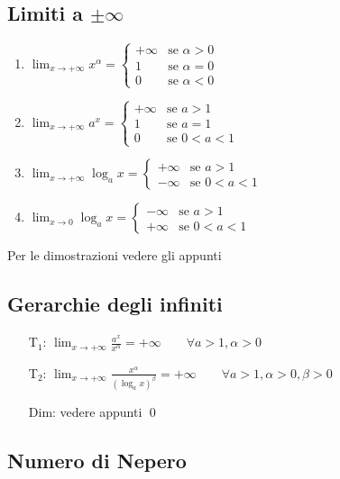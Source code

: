 \documentclass[a4paper]{article}
\begin{document}
\subsection{Limiti a \(\pm \infty\)}
\begin{enumerate}
	\item \(\displaystyle \lim_{x \to + \infty} x ^ \alpha =
	\begin{cases}
		+ \infty & \text{se } \alpha > 0 \\
		1 & \text{se } \alpha = 0 \\
		0 & \text{se } \alpha < 0
	\end{cases}\)
	\item \(\displaystyle \lim_{x \to + \infty} a ^ x =
	\begin{cases}
		+ \infty & \text{se } a > 1 \\
		1 & \text{se } a = 1 \\
		0 & \text{se } 0 < a < 1
	\end{cases}\)
	\item \(\displaystyle \lim_{x \to + \infty} \log_a x =
	\begin{cases}
		+ \infty & \text{se } a > 1 \\
		- \infty & \text{se } 0 < a < 1
	\end{cases}\)
	\item \(\displaystyle \lim_{x \to 0} \log_a x =
	\begin{cases}
		- \infty & \text{se } a > 1 \\
		+ \infty & \text{se } 0 < a < 1
	\end{cases}\)
\end{enumerate}
Per le dimostrazioni vedere gli appunti

\subsection{Gerarchie degli infiniti}
\begin{itemize}
	\item[T\(_1\):] \(\displaystyle \lim_{x \to + \infty} \frac{a^x}{x^\alpha} = + \infty \qquad \forall a > 1, \alpha > 0\)
	\item[T\(_2\):] \(\displaystyle \lim_{x \to + \infty} \frac{x^\alpha}{\left( \log_a x \right) ^ \beta} = + \infty \qquad \forall a > 1, \alpha > 0, \beta > 0\)
	\item[Dim:] vedere appunti \qed
\end{itemize}

\newpage

\subsection{Numero di Nepero}
\end{document}
